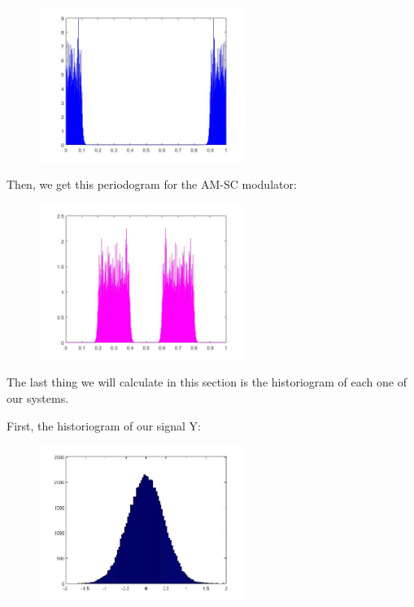 \documentclass[a4paper,11pt]{article}
\begin{document}
\begin{figure}[!hp]
    \begin{center}
    \includegraphics[width=0.6\textwidth]{images/lab3_figure10_1.jpg}
    \end{center}
\end{figure}

\newpage

Then, we get this periodogram for the AM-SC modulator:

\begin{figure}[!hp]
    \begin{center}
    \includegraphics[width=0.6\textwidth]{images/lab3_figure10_4.jpg}
    \end{center}
\end{figure}

The last thing we will calculate in this section is the historiogram of each one of our systems.

First, the historiogram of our signal Y:

\begin{figure}[!hp]
    \begin{center}
    \includegraphics[width=0.6\textwidth]{images/lab3_redo_33.jpg}
    \end{center}
\end{figure}
\end{document}

